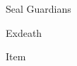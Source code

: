 \begin{paracol}{2}
\begin{boss}{Seal Guardians}
    \varwb
    \begin{round}{1}
        \bartz \rightCommand{\gilToss}
        \everyoneElse \leftCommand{\gilToss}
    \end{round}
    \varwe
\end{boss}

\begin{boss}{Exdeath}
    \varwb
    \begin{round}{1}
        \galuf Item \then \phoenixDown \space \then {}
    \end{round}
    \varwe
\end{boss}

\end{paracol}
